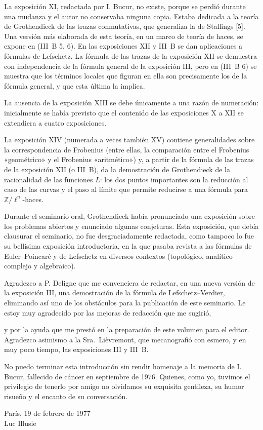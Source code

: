 \clearpage

La exposición XI, redactada por I. Bucur, no existe, porque se perdió durante una mudanza y el autor no conservaba ninguna copia. Estaba dedicada a la teoría de Grothendieck de las trazas conmutativas, que generaliza la de Stallings [5]. Una versión más elaborada de esta teoría, en un marco de teoría de haces, se expone en (III~B 5, 6). En las exposiciones XII y III~B se dan aplicaciones a fórmulas de Lefschetz. La fórmula de las trazas de la exposición XII se demuestra con independencia de la fórmula general de la exposición III, pero en (III~B 6) se muestra que los términos locales que figuran en ella son precisamente los de la fórmula general, y que esta última la implica.

La ausencia de la exposición XIII se debe únicamente a una razón de numeración: inicialmente se había previsto que el contenido de las exposiciones X a XII se extendiera a cuatro exposiciones.

La exposición XIV (numerada a veces también XV) contiene generalidades sobre la correspondencia de Frobenius (entre ellas, la comparación entre el Frobenius «geométrico» y el Frobenius «aritmético») y, a partir de la fórmula de las trazas de la exposición XII (o III~B), da la demostración de Grothendieck de la racionalidad de las funciones $L$: los dos puntos importantes son la reducción al caso de las curvas y el paso al límite que permite reducirse a una fórmula para $\mathbb Z/\ell^n$-haces.

Durante el seminario oral, Grothendieck había pronunciado una exposición sobre los problemas abiertos y enunciado algunas conjeturas. Esta exposición, que debía clausurar el seminario, no fue desgraciadamente redactada, como tampoco lo fue su bellísima exposición introductoria, en la que pasaba revista a las fórmulas de Euler--Poincaré y de Lefschetz en diversos contextos (topológico, analítico complejo y algebraico).

Agradezco a P. Deligne que me convenciera de redactar, en una nueva versión de la exposición III, una demostración de la fórmula de Lefschetz--Verdier, eliminando así uno de los obstáculos para la publicación de este seminario. Le estoy muy agradecido por las mejoras de redacción que me sugirió,

\clearpage
\noindent y por la ayuda que me prestó en la preparación de este volumen para el editor. Agradezco asimismo a la Sra.~Lièvremont, que mecanografió con esmero, y en muy poco tiempo, las exposiciones III y III~B.

No puedo terminar esta introducción sin rendir homenaje a la memoria de I. Bucur, fallecido de cáncer en septiembre de 1976. Quienes, como yo, tuvimos el privilegio de tenerlo por amigo no olvidamos su exquisita gentileza, su humor risueño y el encanto de su conversación.

\begin{flushright}
París, 19 de febrero de 1977\\[1.2em]
Luc Illusie
\end{flushright}
